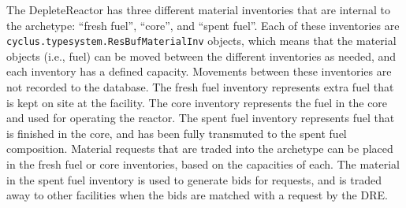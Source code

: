 The DepleteReactor has three different material inventories that 
are internal to the archetype: ``fresh fuel'', ``core'', and ``spent 
fuel''. Each of these inventories are 
\texttt{cyclus.typesystem.ResBufMaterialInv} objects, which means that 
the material objects (i.e., fuel) can be moved between the different 
inventories as needed, and each inventory has a defined capacity. Movements 
between these inventories are not recorded to the database. The fresh 
fuel inventory represents extra fuel that is kept on site at the 
facility. The core inventory represents the fuel in the core 
and used for operating the reactor. The spent fuel inventory 
represents fuel that is finished in the core, and has been fully 
transmuted to the spent fuel composition. Material requests that 
are traded into the archetype can be placed in the fresh fuel 
or core inventories, based on the capacities of each. The 
material in the spent fuel inventory is used to generate bids 
for requests, and is traded away to other facilities when the bids 
are matched with a request by the \gls{DRE}. 

